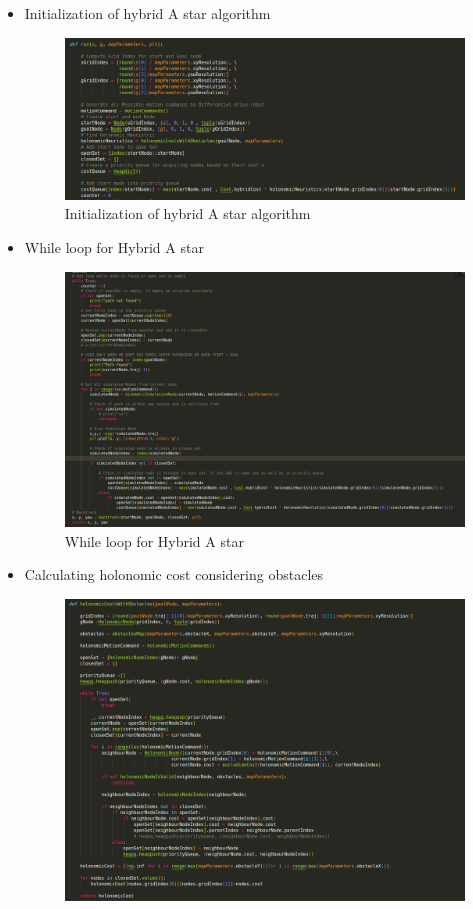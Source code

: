 \documentclass[12pt,a4paper]{article}
\begin{document}
\begin{itemize}
    \item Initialization of hybrid A star algorithm
        \begin{figure}[h!]
        \begin{center}
        \includegraphics[width=0.8\columnwidth]{algorithm/initialization.png}
        \end{center}
        \caption{Initialization of hybrid A star algorithm}
        \label{fig:Hybrid_A-star}
        \end{figure}
    \item While loop for Hybrid A star
        \begin{figure}[h!]
        \begin{center}
        \includegraphics[width=0.8\columnwidth]{algorithm/while_loop.png}
        \end{center}
        \caption{While loop for Hybrid A star}
        \label{fig:Hybrid_A-star}
        \end{figure}
    \item Calculating holonomic cost considering obstacles
        \begin{figure}[h!]
        \begin{center}
        \includegraphics[width=0.8\columnwidth]{algorithm/heuristic_cost.png}

\end{center}
\end{figure}
\end{itemize}
\end{document}
